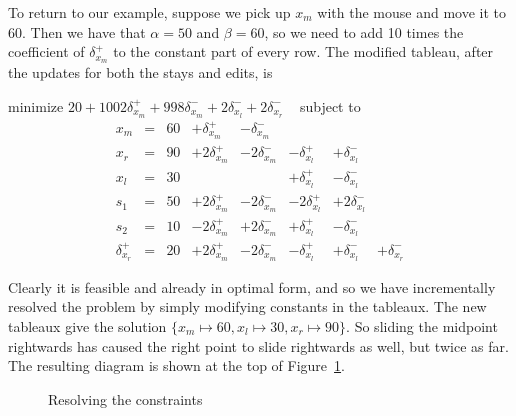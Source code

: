 \documentclass{article}
\begin{document}
To return to our example, suppose we pick up $x_m$ with the mouse and
move it to 60.  Then we have that $\alpha = 50$ and $\beta = 60$,
so we need to add 10 times the 
coefficient of $\delta_{x_m}^+$ to the constant part of every row.
The modified tableau, after the updates for both the stays and edits, is 
\begin{trivlist}\item
minimize $20 + 1002 \delta_{x_m}^+ + 998 \delta_{x_m}^-  + 2
\delta_{x_l}^- + 2\delta_{x_r}^- $ 
~ subject to 
$$
\begin{array}{rlrrrrrr} 
x_m & = &60 &  + \delta_{x_m}^+ & - \delta_{x_m}^- \\
x_r & = &90 & + 2 \delta_{x_m}^+ & - 2\delta_{x_m}^- &
                - \delta_{x_l}^+ & + \delta_{x_l}^- \\ \hline
x_l & = & 30  & & & + \delta_{x_l}^+ & - \delta_{x_l}^- \\
s_1 & = &50 &  + 2 \delta_{x_m}^+ & - 2\delta_{x_m}^- &
                -2 \delta_{x_l}^+ & +2 \delta_{x_l}^- \\
s_2 & = &10 &   - 2 \delta_{x_m}^+ &+2\delta_{x_m}^- &
                + \delta_{x_l}^+ & - \delta_{x_l}^- \\
\delta_{x_r}^+ & = & 20 & + 2 \delta_{x_m}^+  & - 2\delta_{x_m}^- &
        - \delta_{x_l}^+ & + \delta_{x_l}^- & +\delta_{x_r}^-
\end{array}
$$
\end{trivlist}
Clearly it is feasible and already in optimal form, and so we have
incrementally resolved the problem by simply modifying constants in the
tableaux. The new tableaux give the solution
$\{x_m \mapsto 60, x_l \mapsto 30, x_r \mapsto 90\}$.
So sliding the midpoint rightwards 
has caused the right point to slide rightwards as well, but twice as far.
The resulting diagram is shown at the top of Figure~\ref{fig:quasi}.

\begin{figure}[htb]
\begin{center}

\end{center}
\caption{Resolving the constraints\label{fig:quasi}}
\end{figure}
\end{document}
